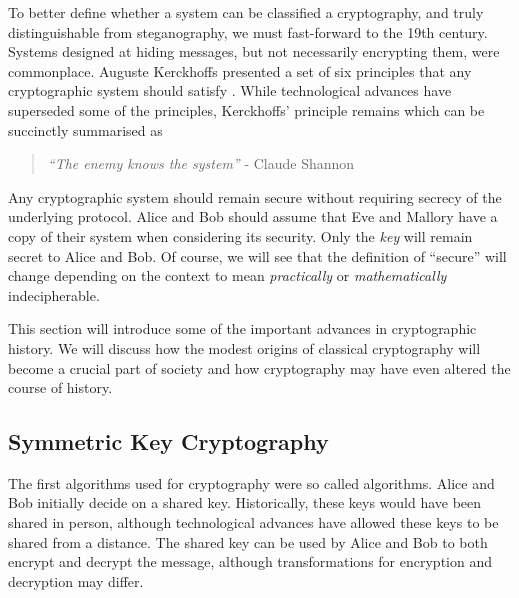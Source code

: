 
To better define whether a system can be classified a cryptography, and truly distinguishable from steganography, we must fast-forward to the 19th century. Systems designed at hiding messages, but not necessarily encrypting them, were commonplace. Auguste Kerckhoffs presented a set of six principles that any cryptographic system should satisfy \cite{KerckhoffsPrincple}. While technological advances have superseded some of the principles, Kerckhoffs' principle remains which can be succinctly summarised as

\begin{quote}
\centering
\textit{``The enemy knows the system''} - Claude Shannon \cite{shannon1949communication}
\end{quote}

Any cryptographic system should remain secure without requiring secrecy of the underlying protocol. Alice and Bob should assume that Eve and Mallory have a copy of their system when considering its security. Only the \textit{key} will remain secret to Alice and Bob. Of course, we will see that the definition of ``secure'' will change depending on the context to mean \textit{practically} or \textit{mathematically} indecipherable. 

This section will introduce some of the important advances in cryptographic history. We will discuss how the modest origins of classical cryptography will become a crucial part of society and how cryptography may have even altered the course of history.

\subsection{Symmetric Key Cryptography}

The first algorithms used for cryptography were so called  algorithms. Alice and Bob initially decide on a shared key. Historically, these keys would have been shared in person, although technological advances have allowed these keys to be shared from a distance. The shared key can be used by Alice and Bob to both encrypt and decrypt the message, although transformations for encryption and decryption may differ.



